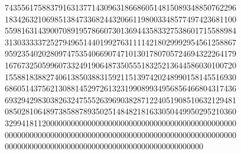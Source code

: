 \documentclass[12pt, a4paper]{article}
\begin{document}
{74355617588379163137714309631866860514815089348850762296\\
18342632106985138473368244320661198003348577497423681100\\
55981631439007089195786607301369443583327538601715588984\\
31303333372527949651440199276311114218029992954561258867\\
95923540202809747535406690747101301780705724694322264179\\
16767325059960733249190648735055518325213644586030100720\\
15588183882740613850388315921151397420248990158145516930\\
68605143756213088145297261323199089934956856466804317436\\
69329429830382632475552639690382871224051908510632129481\\
08502810648973858878935025148482181633050449950295210360\\
32994181120000000000000000000000000000000000000000000000\\
00000000000000000000000000000000000000000000000000000000\\
000000000000000000000000000000000000000000000000\\
}

\newpage
\end{document}
